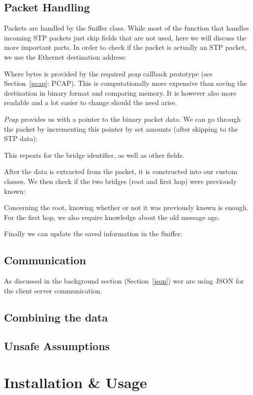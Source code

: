 \subsection{Packet Handling}
\label{packet_handling}
Packets are handled by the Sniffer class.
While most of the function that handles incoming STP packets just skip fields that are not used, here we will discuss the more important parts.
In order to check if the packet is actually an STP packet, we use the Ethernet destination address:

Where bytes is provided by the required \textit{pcap} callback prototype (see Section~\ref{pcap}: PCAP).
This is computationally more expensive than saving the destination in binary format and comparing memory.
It is however also more readable and a lot easier to change should the need arise.

\textit{Pcap} provides us with a pointer to the binary packet data.
We can go through the packet by incrementing this pointer by set amounts (after skipping to the STP data):

This repeats for the bridge identifier, as well as other fields.

After the data is extracted from the packet, it is constructed into our custom classes.
We then check if the two bridges (root and first hop) were previously known:

Concerning the root, knowing whether or not it was previously known is enough.
For the first hop, we also require knowledge about the old message age.

Finally we can update the saved information in the Sniffer:

\subsection{Communication}
\label{communication}
As discussed in the background section (Section~\ref{json}) wer are using JSON for the client server communication.
\subsection{Combining the data}
\label{combining_data}
\subsection{Unsafe Assumptions}
\label{unsafe_assumptions}
\section{Installation \& Usage}
